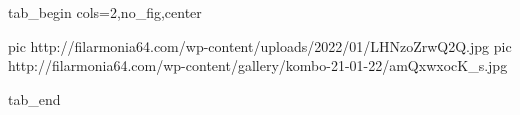  
 
 
 
 


\ifcmt
  tab_begin cols=2,no_fig,center

     pic http://filarmonia64.com/wp-content/uploads/2022/01/LHNzoZrwQ2Q.jpg
		 pic http://filarmonia64.com/wp-content/gallery/kombo-21-01-22/amQxwxocK_s.jpg

  tab_end
\fi
